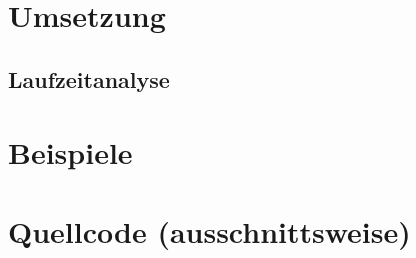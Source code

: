 \documentclass[a4paper,10pt,ngerman]{scrartcl}
\begin{document}


\section{Umsetzung}

\subsection{Laufzeitanalyse}

\section{Beispiele}

\section{Quellcode (ausschnittsweise)}

\listoftodos
\end{document}
